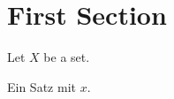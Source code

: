 \documentclass[english]{../uni-def}
\begin{document}
\maketitle

\tableofcontents
\newpage

\section{First Section}
\begin{defi} 
Let $X$ be a set.
\end{defi}

\begin{theorem}
Ein Satz mit $x$.
\end{theorem}
\end{document}
